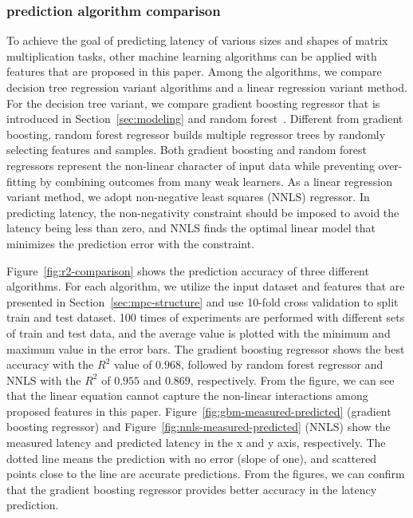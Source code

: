 \documentclass[10pt, conference, compsocconf]{IEEEtran}
\begin{document}
\subsubsection{prediction algorithm comparison}
To achieve the goal of predicting latency of various sizes and shapes of matrix multiplication tasks, other machine learning algorithms can be applied with features that are proposed in this paper. Among the algorithms, we compare decision tree regression variant algorithms and a linear regression variant method. For the decision tree variant, we compare gradient boosting regressor that is introduced in Section~\ref{sec:modeling} and random forest~\cite{random-forest}. Different from gradient boosting, random forest regressor builds multiple regressor trees by randomly selecting features and samples. Both gradient boosting and random forest regressors represent the non-linear character of input data while preventing over-fitting by combining outcomes from many weak learners. As a linear regression variant method, we adopt non-negative least squares (NNLS) regressor. In predicting latency, the non-negativity constraint should be imposed to avoid the latency being less than zero, and NNLS finds the optimal linear model that minimizes the prediction error with the constraint.

Figure~\ref{fig:r2-comparison} shows the prediction accuracy of three different algorithms. For each algorithm, we utilize the input dataset and features that are presented in Section~\ref{sec:mpc-structure} and use 10-fold cross validation to split train and test dataset. 100 times of experiments are performed with different sets of train and test data, and the average value is plotted with the minimum and maximum value in the error bars. The gradient boosting regressor shows the best accuracy with the $R^2$ value of $0.968$, followed by random forest regressor and NNLS with the $R^2$ of $0.955$ and $0.869$, respectively. From the figure, we can see that the linear equation cannot capture the non-linear interactions among proposed features in this paper. Figure~\ref{fig:gbm-measured-predicted} (gradient boosting regressor) and Figure~\ref{fig:nnls-measured-predicted} (NNLS) show the measured latency and predicted latency in the x and y axis, respectively. The dotted line means the prediction with no error (slope of one), and scattered points close to the line are accurate predictions. From the figures, we can confirm that the gradient boosting regressor provides better accuracy in the latency prediction.
\end{document}
